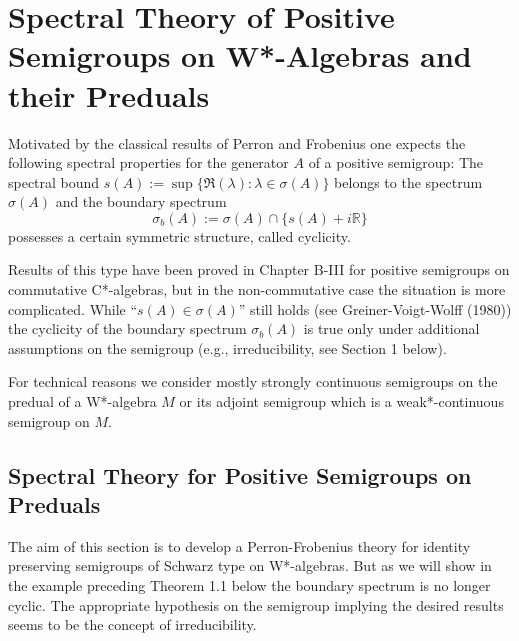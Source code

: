 
\chapter{Spectral Theory of Positive Semigroups on W*-Algebras and their Preduals}

Motivated by the classical results of Perron and Frobenius one expects the following spectral properties for the generator $A$ of a positive semigroup: The spectral bound $s(A) := \sup\{\Re(\lambda) : \lambda \in \sigma(A)\}$ belongs to the spectrum $\sigma(A)$ and the boundary spectrum
\[
\sigma_{b}(A) := \sigma(A) \cap \{s(A)+i\mathbb{R}\}
\]
possesses a certain symmetric structure, called cyclicity.

Results of this type have been proved in Chapter B-III for positive semigroups on commutative C*-algebras, but in the non-commutative case the situation is more complicated.
While \enquote{$s(A) \in \sigma(A)$} still holds (see Greiner-Voigt-Wolff (1980)) the cyclicity of the boundary spectrum $\sigma_{b}(A)$ is true only under additional assumptions on the semigroup (e.g., irreducibility, see Section 1 below).

For technical reasons we consider mostly strongly continuous semigroups on the predual of a W*-algebra $M$ or its adjoint semigroup which is a weak*-continuous semigroup on $M$.

\section{Spectral Theory for Positive Semigroups on Preduals}

The aim of this section is to develop a Perron-Frobenius theory for identity preserving semigroups of Schwarz type on W*-algebras.
But as we will show in the example preceding Theorem 1.1 below the boundary spectrum is no longer cyclic.
The appropriate hypothesis on the semigroup implying the desired results seems to be the concept of irreducibility.

